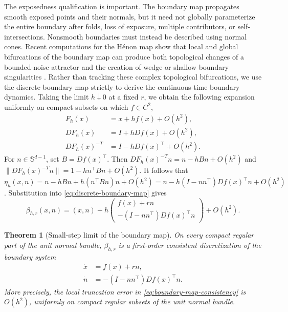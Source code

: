 \documentclass[pdflatex,sn-mathphys-num]{sn-jnl}
\numberwithin{equation}{section}
\theoremstyle{thmstyleone}%
\newtheorem{theorem}{Theorem}[section]
\theoremstyle{definition}
\theoremstyle{remark}
\begin{document}
The exposedness qualification is important. The boundary map propagates smooth exposed points and their normals, but it need not globally parameterize the entire boundary after folds, loss of exposure, multiple
contributors, or self-intersections. Nonsmooth boundaries must instead be described using normal cones. Recent computations for the H\'enon map show that local and global bifurcations of the boundary map can produce both
topological changes of a bounded-noise attractor and the creation of wedge or shallow boundary singularities \citep{lamb2026bifurcations}. Rather than tracking these complex topological bifurcations, we use the discrete boundary map strictly to derive the continuous-time boundary dynamics. Taking the limit $h \downarrow 0$ at a fixed $r$, we obtain the following expansion uniformly on compact subsets on which $f\in C^2$,
\begin{align*}
    F_h(x)
    &=
    x+hf(x)+O(h^2),\\
    DF_h(x)
    &=
    I+hDf(x)+O(h^2),\\
    DF_h(x)^{-T}
    &=
    I-hDf(x)^\top+O(h^2).
\end{align*}
For $n\in\mathbb S^{d-1}$, set $B=Df(x)^\top$. Then $DF_h(x)^{-T}n=n-hBn+O(h^2)$ and $\|DF_h(x)^{-T}n\| = 1-hn^\top Bn+O(h^2)$. It follows that
    $\eta_h(x,n)
    =
    n-hBn+h(n^\top Bn)n+O(h^2)
    =
    n-h(I-nn^\top)Df(x)^\top n+O(h^2)$.
Substitution into \eqref{eq:discrete-boundary-map} gives
\begin{equation}
    \beta_{h,r}(x,n)
    =
    (x,n)
    +
    h
    \begin{pmatrix}
        f(x)+rn\\[1mm]
        -(I-nn^\top)Df(x)^\top n
    \end{pmatrix}
    +O(h^2).
    \label{eq:boundary-map-consistency}
\end{equation}

\begin{theorem}[Small-step limit of the boundary map]
\label{thm:boundary-limit}
On every compact regular part of the unit normal bundle, $\beta_{h,r}$ is a first-order consistent discretization of the boundary system
\begin{align}
    \dot x
    &=
    f(x)+rn,
    \label{eq:continuous-boundary-x}\\
    \dot n
    &=
    -(I-nn^\top)Df(x)^\top n.
    \label{eq:continuous-boundary-n}
\end{align}
More precisely, the local truncation error in \eqref{eq:boundary-map-consistency} is $O(h^2)$, uniformly on compact regular subsets of the unit normal bundle.
\end{theorem}
\end{document}
